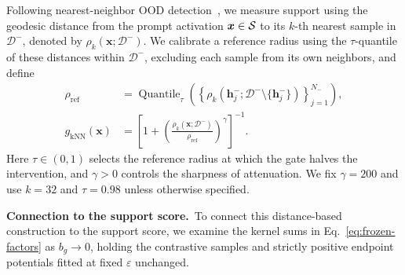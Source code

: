 Following nearest-neighbor OOD detection~\citep{sun2022out}, we measure support using the geodesic distance from the prompt activation $\boldsymbol{x}\in\mathcal{S}$ to its $k$-th nearest sample in $\mathcal{D}^-$, denoted by $\rho_k(\boldsymbol{x};\mathcal{D}^-)$. We calibrate a reference radius using the $\tau$-quantile of these distances within $\mathcal{D}^-$, excluding each sample from its own neighbors, and define
\begin{equation}
\begin{aligned}
\rho_{\mathrm{ref}}
&=\operatorname{Quantile}_{\tau}\!\left(
\left\{\rho_k(\boldsymbol{h}_j^-;\mathcal{D}^-\setminus\{\boldsymbol{h}_j^-\})\right\}_{j=1}^{N_-}
\right),\\
g_{\mathrm{kNN}}(\boldsymbol{x})
&=\left[1+\left(\frac{\rho_k(\boldsymbol{x};\mathcal{D}^-)}{\rho_{\mathrm{ref}}}\right)^\gamma\right]^{-1}.
\end{aligned}
\label{eq:knn-gate}
\end{equation}
Here $\tau\in(0,1)$ selects the reference radius at which the gate halves the intervention, and $\gamma>0$ controls the sharpness of attenuation. We fix $\gamma=200$ and use $k=32$ and $\tau=0.98$ unless otherwise specified.

\noindent\textbf{Connection to the support score.}~\label{apx:knn-connection}To connect this distance-based construction to the support score, we examine the kernel sums in Eq.~\eqref{eq:frozen-factors} as $b_g\to0$, holding the contrastive samples and strictly positive endpoint potentials fitted at fixed $\varepsilon$ unchanged.

